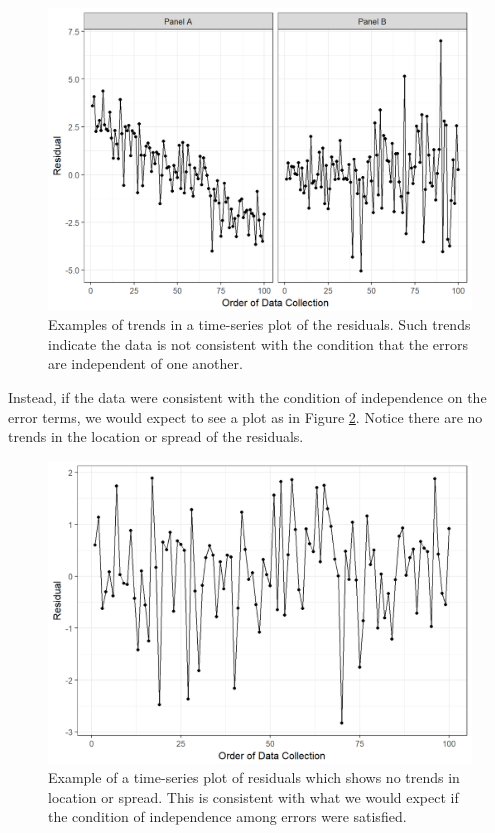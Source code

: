 \documentclass[]{book}
\theoremstyle{definition}
\theoremstyle{definition}
\theoremstyle{definition}
\theoremstyle{remark}
\begin{document}
\begin{figure}

{\centering \includegraphics[width=0.8\linewidth]{./Images/anovaassessment-independence-violations-1} 

}

\caption{Examples of trends in a time-series plot of the residuals.  Such trends indicate the data is not consistent with the condition that the errors are independent of one another.}\label{fig:anovaassessment-independence-violations}
\end{figure}

Instead, if the data were consistent with the condition of independence
on the error terms, we would expect to see a plot as in Figure
\ref{fig:anovaassessment-independence-reasonable}. Notice there are no
trends in the location or spread of the residuals.

\begin{figure}

{\centering \includegraphics[width=0.8\linewidth]{./Images/anovaassessment-independence-reasonable-1} 

}

\caption{Example of a time-series plot of residuals which shows no trends in location or spread.  This is consistent with what we would expect if the condition of independence among errors were satisfied.}\label{fig:anovaassessment-independence-reasonable}
\end{figure}
\end{document}

